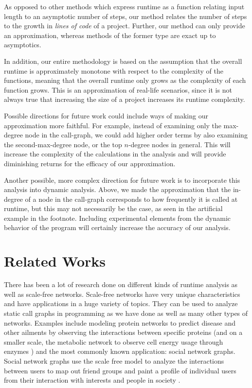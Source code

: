 \documentclass[11pt,a4paper,twocolumn]{article}
\begin{document}
\begin{singlespace}
As opposed to other methods which express runtime as a function relating input
length to an asymptotic number of steps, our method relates the number of steps
to the growth in \emph{lines of code} of a project. Further, our method can
only provide an approximation, whereas methods of the former type are exact
up to asymptotics.

In addition, our entire methodology is based on the assumption that the overall
runtime is approximately monotone with respect to the complexity of the
functions, meaning that the overall runtime only grows as the complexity of
each function grows. This is an approximation of real-life scenarios, since
it is not always true that increasing the size of a project increases its
runtime complexity.

Possible directions for future work could include ways of making our
approximation more faithful. For example, instead of examining only the
max-degree node in the call-graph, we could add higher order terms by also
examining the second-max-degree node, or the top $n$-degree nodes in general.
This will increase the complexity of the calculations in the analysis and
will provide diminishing returns for the efficacy of our approximation.

Another possible, more complex direction for future work is to incorporate
this analysis into dynamic analysis. Above, we made the approximation that
the in-degree of a node in the call-graph corresponds to how frequently it is
called at runtime, but this may not necessarily be the case, as seen in the
artificial example in the footnote. Including experimental elements from
the dynamic behavior of the program will certainly increase the accuracy of
our analysis.

\section{Related Works}

There has been a lot of research done on different kinds of runtime analysis as
well as scale-free networks. Scale-free networks have very unique characteristics
and have applications in a huge variety of topics. They can be used to analyze
static call graphs in programming as we have done as well as many other types
of networks. Examples include modeling protein networks to predict disease and
other ailments by observing the interactions between specific proteins (and on
a smaller scale, the metabolic network to observe cell energy usage through
enzymes \cite{nisis}) and the most commonly known application: social network
graphs. Social network graphs use the scale free model to analyze the
interactions between users to map out friend groups and paint a profile of
individual users from their interaction with interests and people in society
\cite{DUR}.


\end{singlespace}
\end{document}

